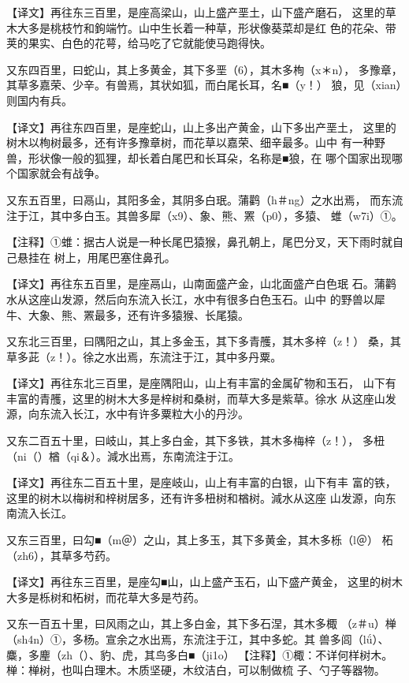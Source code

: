 \documentclass[a4paper,12pt,UTF8,twoside]{ctexbook}
\begin{document}
【译文】再往东三百里，是座高梁山，山上盛产垩土，山下盛产磨石， 这里的草木大多是桃枝竹和鉤端竹。山中生长着一种草，形状像葵菜却是红 色的花朵、带荚的果实、白色的花萼，给马吃了它就能使马跑得快。

又东四百里，曰蛇山，其上多黄金，其下多垩（6），其木多栒（x＊n）， 多豫章，其草多嘉荣、少辛。有兽焉，其状如狐，而白尾长耳，名■（y！） 狼，见（xian）则国内有兵。

【译文】再往东四百里，是座蛇山，山上多出产黄金，山下多出产垩土， 这里的树木以栒树最多，还有许多豫章树，而花草以嘉荣、细辛最多。山中 有一种野兽，形状像一般的狐狸，却长着白尾巴和长耳朵，名称是■狼，在 哪个国家出现哪个国家就会有战争。

又东五百里，曰鬲山，其阳多金，其阴多白珉。蒲鹳（h＃ng）之水出焉， 而东流注于江，其中多白玉。其兽多犀（x9）、象、熊、罴（p0），多猿、 蜼（w7i）①。

【注释】①蜼：据古人说是一种长尾巴猿猴，鼻孔朝上，尾巴分叉，天下雨时就自己悬挂在 树上，用尾巴塞住鼻孔。

【译文】再往东五百里，是座鬲山，山南面盛产金，山北面盛产白色珉 石。蒲鹳水从这座山发源，然后向东流入长江，水中有很多白色玉石。山中 的野兽以犀牛、大象、熊、罴最多，还有许多猿猴、长尾猿。

又东北三百里，曰隅阳之山，其上多金玉，其下多青雘，其木多梓（z！） 桑，其草多茈（z！）。徐之水出焉，东流注于江，其中多丹粟。

【译文】再往东北三百里，是座隅阳山，山上有丰富的金属矿物和玉石， 山下有丰富的青雘，这里的树木大多是梓树和桑树，而草大多是紫草。徐水 从这座山发源，向东流入长江，水中有许多粟粒大小的丹沙。

又东二百五十里，曰岐山，其上多白金，其下多铁，其木多梅梓（z！）， 多杻（ni（）楢（qi＆）。減水出焉，东南流注于江。

【译文】再往东二百五十里，是座岐山，山上有丰富的白银，山下有丰 富的铁，这里的树木以梅树和梓树居多，还有许多杻树和楢树。減水从这座 山发源，向东南流入长江。

又东三百里，曰勾■（m＠）之山，其上多玉，其下多黄金，其木多栎（l＠） 柘（zh6），其草多芍药。

【译文】再往东三百里，是座勾■山，山上盛产玉石，山下盛产黄金， 这里的树木大多是栎树和柘树，而花草大多是芍药。

又东一百五十里，曰风雨之山，其上多白金，其下多石涅，其木多棷 （z＃u）椫（sh4n）①，多杨。宣余之水出焉，东流注于江，其中多蛇。其 兽多闾（lǘ）、麋，多麈（zh（）、豹、虎，其鸟多白■（ji1o）  【注释】①棷：不详何样树木。椫：椫树，也叫白理木。木质坚硬，木纹洁白，可以制做梳 子、勺子等器物。
\end{document}
